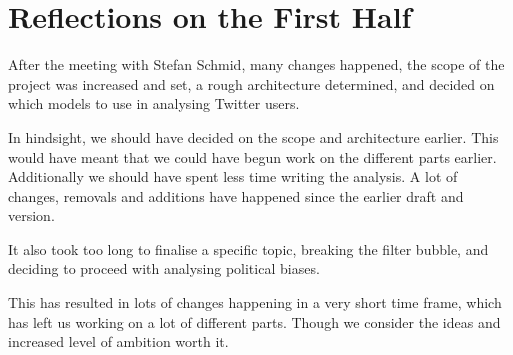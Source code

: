 \section{Reflections on the First Half}\label{sec:FirRef}
After the meeting with Stefan Schmid, many changes happened, the scope of the
project was increased and set, a rough architecture determined, and decided on which
models to use in analysing Twitter users.\nl

In hindsight, we should have decided on the scope and architecture earlier. This
would have meant that we could have begun work on the different parts earlier.
Additionally we should have spent less time writing the analysis. A lot of
changes, removals and additions have happened since the earlier draft and
version.\nl

It also took too long to finalise a specific topic, breaking the
filter bubble, and deciding to proceed with analysing political biases.\nl

This has resulted in lots of changes happening in a very short time frame,
which has left us working on a lot of different parts. Though we consider the
ideas and increased level of ambition worth it.
